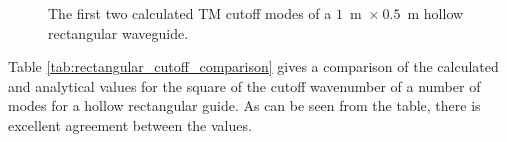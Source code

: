 \begin{figure}[ht]
\centering
\caption{The first two calculated TM cutoff modes of a $1$~m~$\times~0.5$~m hollow rectangular waveguide.}
\label{fig:rectangular_cutoff_TM}
\end{figure}
Table \ref{tab:rectangular_cutoff_comparison} gives a comparison of
the calculated and analytical values for the square of the cutoff
wavenumber of a number of modes for a hollow
rectangular guide. As can be seen from the table, there is excellent
agreement between the values.

